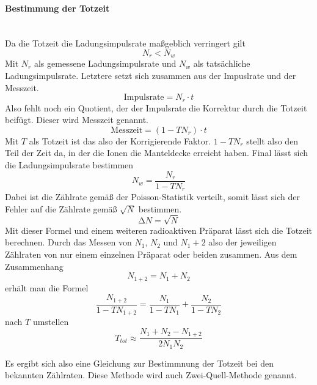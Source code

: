 \paragraph{Bestimmung der Totzeit} 
\label{para:Totzeit}
\mbox{} \\
Da die Totzeit die Ladungsimpulsrate maßgeblich verringert gilt
\begin{equation*}
\label{ref:totzeitverhaeltnis}
N_r < N_w
\end{equation*}
Mit $N_r$ als gemessene Ladungsimpulsrate und $N_w$ als tatsächliche Ladungsimpulsrate. 
Letztere setzt sich zusammen aus der Impuslrate und der Messzeit.
\begin{equation*}
\text{Impulsrate} = N_r \cdot t
\end{equation*} 
Also fehlt noch ein Quotient, der der Impulsrate die Korrektur durch die Totzeit beifügt. Dieser wird Messzeit genannt.
\begin{equation*}
\text{Messzeit} = (1-TN_r) \cdot t
\end{equation*}
Mit $T$ als Totzeit ist das also der Korrigierende Faktor. $1-TN_r$ stellt also den Teil der Zeit da, in der die Ionen die Manteldecke erreicht haben.
Final lässt sich die Ladungsimpulsrate bestimmen 
\begin{equation}
\label{ref:Ladungsimpulsrate}
N_w = \frac{N_r}{1-TN_r}
\end{equation}
Dabei ist die Zählrate gemäß der Poisson-Statistik verteilt, somit lässt sich der Fehler auf die Zählrate gemäß $\sqrt{N}$
bestimmen.
\begin{equation}
\label{eqn:fehlerzählrate} %
\increment N = \sqrt{N}
\end{equation}
Mit dieser Formel und einem weiteren radioaktiven Präparat lässt sich die Totzeit berechnen. 
Durch das Messen von $N_1$, $N_2$ und $N_1+2$ also der jeweiligen Zählraten von nur einem einzelnen Präparat oder beiden zusammen.
Aus dem Zusammenhang 
\begin{equation*}
N_{1+2} = N_{1} + N_{2}
\end{equation*}
erhält man die Formel
\begin{equation*}
\frac{N_{1+2}}{1-TN_{1+2}}=\frac{N_1}{1-TN_1} + \frac{N_2}{1-TN_2}
\end{equation*}
nach $T$ umstellen
\begin{equation}
\label{eqn:totzeit}
T_{tot} \approx \frac{N_1+N_2-N_{1+2}}{2N_1N_2}
\end{equation}
\begin{flushleft}
Es ergibt sich also eine Gleichung zur Bestimmnung der Totzeit bei den bekannten Zählraten. 
Diese Methode wird auch Zwei-Quell-Methode genannt.
\end{flushleft}

